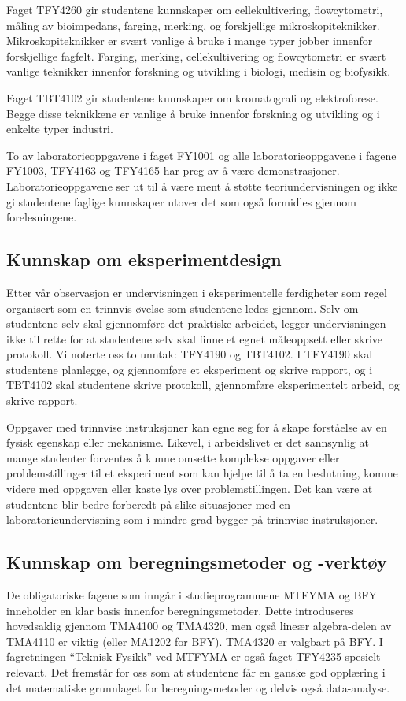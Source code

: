 \documentclass{article}
\begin{document}
Faget TFY4260 gir studentene kunnskaper om cellekultivering, flowcytometri, måling av bioimpedans, farging, merking, og forskjellige mikroskopiteknikker. Mikroskopiteknikker er svært vanlige å bruke i mange typer jobber innenfor forskjellige fagfelt. Farging, merking, cellekultivering og flowcytometri er svært vanlige teknikker innenfor forskning og utvikling i biologi, medisin og biofysikk.

Faget TBT4102 gir studentene kunnskaper om kromatografi og elektroforese. Begge disse teknikkene er vanlige å bruke innenfor forskning og utvikling og i enkelte typer industri.

To av laboratorieoppgavene i faget FY1001 og alle laboratorieoppgavene i fagene FY1003, TFY4163 og TFY4165 har preg av å være demonstrasjoner. Laboratorieoppgavene ser ut til å være ment å støtte teoriundervisningen og ikke gi studentene faglige kunnskaper utover det som også formidles gjennom forelesningene.

\subsection{Kunnskap om eksperimentdesign}
Etter vår observasjon er undervisningen i eksperimentelle ferdigheter som regel organisert som en trinnvis øvelse som studentene ledes gjennom. Selv om studentene selv skal gjennomføre det praktiske arbeidet, legger undervisningen ikke til rette for at studentene selv skal finne et egnet måleoppsett eller skrive protokoll. Vi noterte oss to unntak: TFY4190 og TBT4102. I TFY4190 skal studentene planlegge, og gjennomføre et eksperiment og skrive rapport, og i TBT4102 skal studentene skrive protokoll, gjennomføre eksperimentelt arbeid, og skrive rapport.

Oppgaver med trinnvise instruksjoner kan egne seg for å skape forståelse av en fysisk egenskap eller mekanisme. Likevel, i arbeidslivet er det sannsynlig at mange studenter forventes å kunne omsette komplekse oppgaver eller problemstillinger til et eksperiment som kan hjelpe til å ta en beslutning, komme videre med oppgaven eller kaste lys over problemstillingen. Det kan være at studentene blir bedre forberedt på slike situasjoner med en laboratorieundervisning som i mindre grad bygger på trinnvise instruksjoner. 

\subsection{Kunnskap om beregningsmetoder og -verktøy}
De obligatoriske fagene som inngår i studieprogrammene MTFYMA og BFY inneholder en klar basis innenfor beregningsmetoder. Dette introduseres hovedsaklig gjennom TMA4100 og TMA4320, men også lineær algebra-delen av TMA4110 er viktig (eller MA1202 for BFY). TMA4320 er valgbart på BFY. I fagretningen ``Teknisk Fysikk'' ved MTFYMA er også faget TFY4235 spesielt relevant. Det fremstår for oss som at studentene får en ganske god opplæring i det matematiske grunnlaget for beregningsmetoder og delvis også data-analyse.
\end{document}
